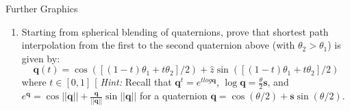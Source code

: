 \documentclass{tripos}  %
\begin{document}
\begin{question}[MockIB,year=2024,paper=2,question=4,author=rrw]{Further Graphics}
\begin{enumerate}
\begin{enumerate}
      \item Starting from spherical blending of quaternions, prove
        that shortest path interpolation from the first to the second
        quaternion above (with $\theta_2 > \theta_1$) is given by:
        \[
        \mathbf{q}(t) = \cos([(1-t)\theta_1 + t\theta_2]/2) + \hat{z}\sin([(1-t)\theta_1  + t\theta_2]/2)
        \]
        where $t \in [0,1]$ [ {\em Hint:} Recall that $\mathbf{q}^t = e^{t log \mathbf{q}}$, $\log \mathbf{q} = \frac{\theta{}}{2}\mathbf{s}$, and $e^{\mathbf{q}} = \cos||\mathbf{q}|| + \frac{\mathbf{q}}{||\mathbf{q}||}\sin ||\mathbf{q}||$ for a quaternion $\mathbf{q} = \cos(\theta / 2) + \mathbf{s}\sin(\theta/2)$.
        \end{enumerate}
    
  \end{enumerate}
  

  
\end{question}
\end{document}
